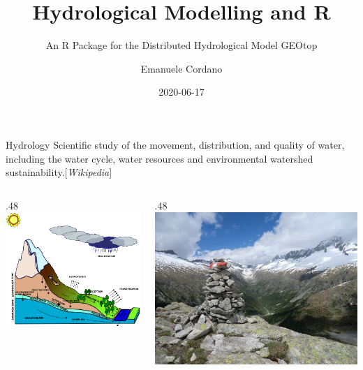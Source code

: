 \documentclass[
  ignorenonframetext,
]{beamer}
\title{Hydrological Modelling and R}
\subtitle{An R Package for the Distributed Hydrological Model GEOtop}
\author{Emanuele Cordano}
\date{2020-06-17}
\def\begincols{\begin{columns}}
\def\begincol{\begin{column}}
\def\endcol{\end{column}}
\def\endcols{\end{columns}}
\begin{document}
\frame{\titlepage}

\begin{frame}{Hydrology}
\protect\hypertarget{hydrology}{}
Scientific study of the movement, distribution, and quality of water,
including the water cycle, water resources and environmental watershed
sustainability.{[}\emph{Wikipedia}{]} \begincols
\begincol{.48\textwidth}
\includegraphics[width=1\textwidth,height=\textheight]{resources/images/geotop_landscape.png}\\
\endcol \begincol{.48\textwidth}
\includegraphics[width=1\textwidth,height=\textheight]{resources/images/valdifumo.jpg}\\
\endcol \endcols
\end{frame}
\end{document}
